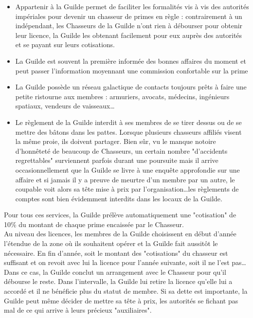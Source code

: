 \documentclass[twoside]{article}
\begin{document}
\begin{itemize}
	\item Appartenir à la Guilde permet de faciliter les formalités vis à vis des autorités impériales pour devenir un chasseur de primes en règle : contrairement à un indépendant, les Chasseurs de la Guilde n'ont rien à débourser pour obtenir leur licence, la Guilde les obtenant facilement pour eux auprès des autorités et se payant sur leurs cotisations.
	\item La Guilde est souvent la première informée des bonnes affaires du moment et peut passer l'information moyennant une commission confortable sur la prime
	\item La Guilde possède un réseau galactique de contacts toujours prêts à faire une petite ristourne aux membres : armuriers, avocats, médecins, ingénieurs spatiaux, vendeurs de vaisseaux\ldots
	\item Le règlement de la Guilde interdit à ses membres de se tirer dessus ou de se mettre des bâtons dans les pattes. Lorsque plusieurs chasseurs affiliés visent la même proie, ils doivent partager. Bien sûr, vu le manque notoire d'honnêteté de beaucoup de Chasseurs, un certain nombre "d'accidents regrettables" surviennent parfois durant une poursuite mais il arrive occasionnellement que la Guilde se livre à une enquête approfondie sur une affaire et si jamais il y a preuve de meurtre d'un membre par un autre, le coupable voit alors sa tête mise à prix par l'organisation\ldots les règlements de comptes sont bien évidemment interdits dans les locaux de la Guilde. 
\end{itemize}

Pour tous ces services, la Guilde prélève automatiquement une "cotisation" de 10\% du montant de chaque prime encaissée par le Chasseur.\\

Au niveau des licences, les membres de la Guilde choisissent en début d'année l'étendue de la zone où ils souhaitent opérer et la Guilde fait aussitôt le nécessaire. En fin d'année, soit le montant des "cotisations" du chasseur est suffisant et on revoit avec lui la licence pour l'année suivante, soit il ne l'est pas\ldots\\

Dans ce cas, la Guilde conclut un arrangement avec le Chasseur pour qu'il débourse le reste. Dans l'intervalle, la Guilde lui retire la licence qu'elle lui a accordé et il ne bénéficie plus du statut de membre. Si sa dette est importante, la Guilde peut même décider de mettre sa tête à prix, les autorités se fichant pas mal de ce qui arrive à leurs précieux "auxiliaires".\\
\end{document}
